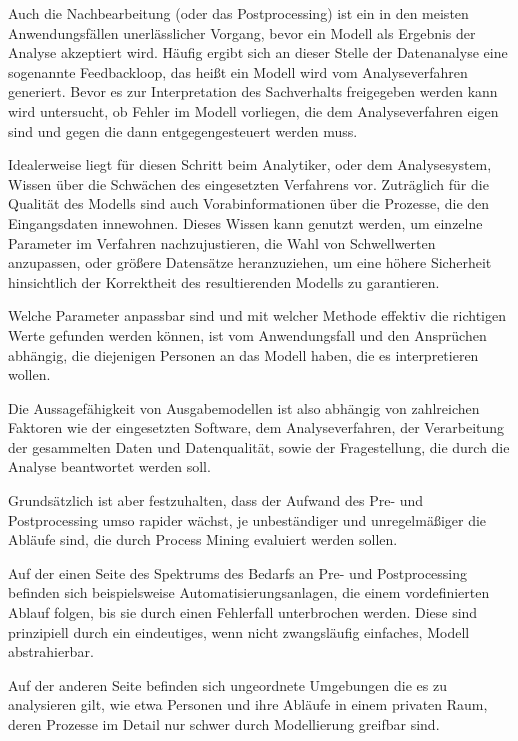Auch die Nachbearbeitung (oder das Postprocessing) ist ein in den meisten Anwendungsfällen unerlässlicher Vorgang, bevor ein  Modell als Ergebnis der Analyse akzeptiert wird. Häufig ergibt sich an dieser Stelle der Datenanalyse eine sogenannte Feedbackloop, das heißt ein Modell wird vom Analyseverfahren generiert. Bevor es zur Interpretation des Sachverhalts freigegeben werden kann wird untersucht, ob Fehler im Modell vorliegen, die dem Analyseverfahren eigen sind und gegen die dann entgegengesteuert werden muss. 

Idealerweise liegt für diesen Schritt beim Analytiker, oder dem Analysesystem, Wissen über die Schwächen des eingesetzten Verfahrens vor. Zuträglich für die Qualität des Modells sind auch Vorabinformationen über die Prozesse, die den Eingangsdaten innewohnen. Dieses Wissen kann genutzt werden, um einzelne Parameter im Verfahren nachzujustieren, die Wahl von Schwellwerten anzupassen, oder größere Datensätze heranzuziehen, um eine höhere Sicherheit hinsichtlich der Korrektheit des resultierenden Modells zu garantieren.

Welche Parameter anpassbar sind und mit welcher Methode effektiv die richtigen Werte gefunden werden können, ist vom Anwendungsfall und den Ansprüchen abhängig, die diejenigen Personen an das Modell haben, die es interpretieren wollen. 

Die Aussagefähigkeit von Ausgabemodellen ist also abhängig von zahlreichen Faktoren wie der eingesetzten Software, dem Analyseverfahren, der Verarbeitung der gesammelten Daten und Datenqualität, sowie der Fragestellung, die durch die Analyse beantwortet werden soll.

Grundsätzlich ist aber festzuhalten, dass der Aufwand des Pre- und Postprocessing umso rapider wächst, je unbeständiger und unregelmäßiger die Abläufe sind, die durch Process Mining evaluiert werden sollen. 

Auf der einen Seite des Spektrums des Bedarfs an Pre- und Postprocessing befinden sich  beispielsweise Automatisierungsanlagen, die einem vordefinierten Ablauf folgen, bis sie durch einen Fehlerfall unterbrochen werden. Diese sind prinzipiell durch ein eindeutiges, wenn nicht zwangsläufig einfaches, Modell abstrahierbar.

Auf der anderen Seite befinden sich ungeordnete Umgebungen die es zu analysieren gilt, wie etwa Personen und ihre Abläufe in einem privaten Raum, deren Prozesse im Detail nur schwer durch Modellierung greifbar sind. 
